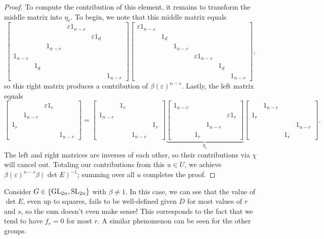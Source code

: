 \begin{proof}
	To compute the contribution of this element, it remains to transform the middle matrix into $\eta_r$. To begin, we note that this middle matrix equals
	\[\begin{bmatrix}
		&&& \varepsilon1_{n-s} \\ &&&& \varepsilon1_d \\ && 1_{n-r} \\
		1_{n-s} \\ & 1_d \\ &&&&& 1_{n-r}
	\end{bmatrix}\begin{bmatrix}
		\varepsilon1_{n-s} \\ & 1_d \\ && 1_{n-r} \\
		&&& \varepsilon1_{n-s} \\ &&&& 1_d \\ &&&&& 1_{n-r}
	\end{bmatrix},\]
	so this right matrix produces a contribution of $\beta(\varepsilon)^{n-s}$. Lastly, the left matrix equals
	\[\begin{bmatrix}
		&& \varepsilon1_r \\ & 1_{n-r} \\
		1_r \\ &&& 1_{n-r}
	\end{bmatrix}=\begin{bmatrix}
		& 1_{r} \\ 1_{n-r} \\
		&&& 1_{r} \\ && 1_{n-r}
	\end{bmatrix}\underbrace{\begin{bmatrix}
		1_{n-r} \\ &&& \varepsilon1_r \\
		&& 1_{n-r} \\ & 1_r
	\end{bmatrix}}_{\eta_r}\begin{bmatrix}
		& 1_{n-r} \\ 1_{r} \\
		&&& 1_{n-r} \\ && 1_{r}
	\end{bmatrix}.\]
	The left and right matrices are inverses of each other, so their contributions via $\chi$ will cancel out. Totaling our contributions from this $u\in U$, we achieve $\beta(\varepsilon)^{n-s}\beta(\det E)^{-1}$; summing over all $u$ completes the proof.
\end{proof}
\begin{remark}
	Consider $G\in\{\mathrm{GL}_{2n},\mathrm{SL}_{2n}\}$ with $\beta\ne1$. In this case, we can see that the value of $\det E$, even up to squares, fails to be well-defined given $D$ for most values of $r$ and $s$, so the sum doesn't even make sense! This corresponds to the fact that we tend to have $f_r=0$ for most $r$. A similar phenomenon can be seen for the other groups.
\end{remark}
